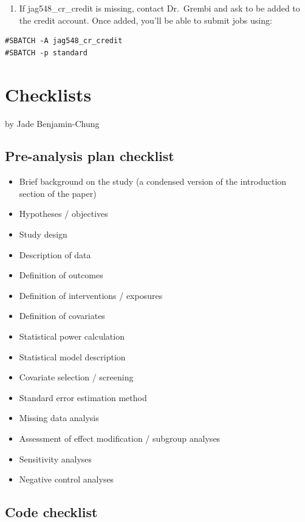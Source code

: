 \documentclass[
]{book}
\providecommand{\tightlist}{%
  \setlength{\itemsep}{0pt}\setlength{\parskip}{0pt}}
\begin{document}
\begin{enumerate}
\def\labelenumi{\arabic{enumi}.}
\setcounter{enumi}{1}
\tightlist
\item
  If jag548\_cr\_credit is missing, contact Dr.~Grembi and ask to be added to the credit account. Once added, you'll be able to submit jobs using:
\end{enumerate}

\begin{verbatim}
#SBATCH -A jag548_cr_credit
#SBATCH -p standard
\end{verbatim}

\chapter{Checklists}\label{checklists}

by Jade Benjamin-Chung

\section{Pre-analysis plan checklist}\label{pre-analysis-plan-checklist}

\begin{itemize}
\tightlist
\item
  Brief background on the study (a condensed version of the introduction section of the paper)
\item
  Hypotheses / objectives
\item
  Study design
\item
  Description of data
\item
  Definition of outcomes
\item
  Definition of interventions / exposures
\item
  Definition of covariates
\item
  Statistical power calculation
\item
  Statistical model description
\item
  Covariate selection / screening
\item
  Standard error estimation method
\item
  Missing data analysis
\item
  Assessment of effect modification / subgroup analyses
\item
  Sensitivity analyses
\item
  Negative control analyses
\end{itemize}

\section{Code checklist}\label{code-checklist}
\end{document}
